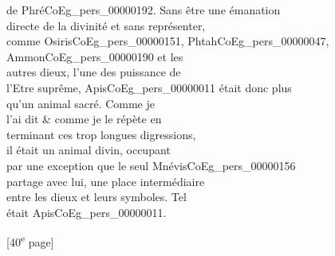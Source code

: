 \documentclass{book}
\begin{document}
{\begin{paracol}{2}
de Phré\gls{CoEg_pers_00000192}. Sans être une émanation\\
directe de la divinité et sans représenter,\\
comme Osiris\gls{CoEg_pers_00000151}, Phtah\gls{CoEg_pers_00000047}, Ammon\gls{CoEg_pers_00000190} et les\\
autres dieux, l’une des puissance de\\
l’Etre suprême, Apis\gls{CoEg_pers_00000011} était donc plus\\
qu’un animal sacré. Comme je\\
l’ai dit \& comme je le répète en\\
terminant ces trop longues digressions,\\
il était un animal divin, occupant\\
par une exception que le seul Mnévis\gls{CoEg_pers_00000156}\\
partage avec lui, une place intermédiaire\\
entre les dieux et leurs symboles. Tel\\
était Apis\gls{CoEg_pers_00000011}.
\end{paracol}

{\footnotesize\begin{center} {[40\textsuperscript{e} page]}\end{center}}

}
\end{document}
